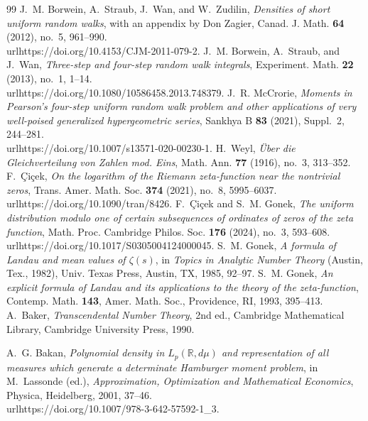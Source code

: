 \documentclass[pdflatex,sn-mathphys-num]{sn-jnl}
\numberwithin{equation}{section}
\theoremstyle{thmstyleone}
\theoremstyle{thmstylethree}
\theoremstyle{thmstyletwo}
\newcommand{\1}{\mathbf 1}
\begin{document}
\begin{thebibliography}{99}
J.~M. Borwein, A.~Straub, J.~Wan, and W.~Zudilin,
\textit{Densities of short uniform random walks},
with an appendix by Don Zagier,
Canad. J. Math. \textbf{64} (2012), no.~5, 961--990.
\\url{https://doi.org/10.4153/CJM-2011-079-2}.
J.~M. Borwein, A.~Straub, and J.~Wan,
\textit{Three-step and four-step random walk integrals},
Experiment. Math. \textbf{22} (2013), no.~1, 1--14.
\\url{https://doi.org/10.1080/10586458.2013.748379}.
J.~R. McCrorie,
\textit{Moments in Pearson's four-step uniform random walk problem and other applications of very well-poised generalized hypergeometric series},
Sankhya B \textbf{83} (2021), Suppl.~2, 244--281.
\\url{https://doi.org/10.1007/s13571-020-00230-1}.
H.~Weyl,
\textit{\"Uber die Gleichverteilung von Zahlen mod. Eins},
Math. Ann. \textbf{77} (1916), no.~3, 313--352.
F.~\c{C}i\c{c}ek,
\textit{On the logarithm of the Riemann zeta-function near the nontrivial zeros},
Trans. Amer. Math. Soc. \textbf{374} (2021), no.~8, 5995--6037.
\\url{https://doi.org/10.1090/tran/8426}.
F.~\c{C}i\c{c}ek and S.~M. Gonek,
\textit{The uniform distribution modulo one of certain subsequences of ordinates of zeros of the zeta function},
Math. Proc. Cambridge Philos. Soc. \textbf{176} (2024), no.~3, 593--608.
\\url{https://doi.org/10.1017/S0305004124000045}.
S.~M. Gonek,
\textit{A formula of Landau and mean values of $\zeta(s)$},
in \textit{Topics in Analytic Number Theory} (Austin, Tex., 1982),
Univ. Texas Press, Austin, TX, 1985, 92--97.
S.~M. Gonek,
\textit{An explicit formula of Landau and its applications to the theory of the zeta-function},
Contemp. Math. \textbf{143}, Amer. Math. Soc., Providence, RI, 1993, 395--413.
A.~Baker,
\textit{Transcendental Number Theory},
2nd ed., Cambridge Mathematical Library, Cambridge University Press, 1990.

A.~G. Bakan,
\textit{Polynomial density in $L_p(\mathbb R,d\mu)$ and representation of all measures which generate a determinate Hamburger moment problem},
in M.~Lassonde (ed.), \textit{Approximation, Optimization and Mathematical Economics},
Physica, Heidelberg, 2001, 37--46.
\\url{https://doi.org/10.1007/978-3-642-57592-1\_3}.


\end{thebibliography}
\end{document}
